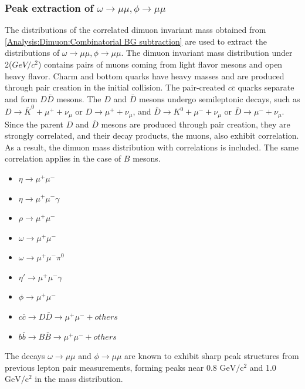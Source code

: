             \subsubsection{Peak extraction of $\omega \rightarrow \mu\mu ,\phi \rightarrow \mu\mu$}
            \label{Peak_extraction}
                The distributions of the correlated dimuon invariant mass obtained from \ref{Analysis:Dimuon:Combinatorial BG subtraction} are used to extract the distributions of $\omega \rightarrow \mu\mu,\phi \rightarrow \mu\mu$. The dimuon invariant mass distribution under 2($GeV/c^2$) contains pairs of muons coming from light flavor mesons and open heavy flavor. Charm and bottom quarks have heavy masses and are produced through pair creation in the initial collision. The pair-created \(c\bar{c}\) quarks separate and form \(D\bar{D}\) mesons. The \(D\) and \(\bar{D}\) mesons undergo semileptonic decays, such as \(D \rightarrow \bar{K}^0 + \mu^+ + \nu_\mu\) or \(D \rightarrow \mu^+ + \nu_\mu\), and \(\bar{D} \rightarrow K^0 + \mu^- + \nu_\mu\) or \(\bar{D} \rightarrow \mu^- + \nu_\mu\). Since the parent \(D\) and \(\bar{D}\) mesons are produced through pair creation, they are strongly correlated, and their decay products, the muons, also exhibit correlation. As a result, the dimuon mass distribution with correlations is included. The same correlation applies in the case of \(B\) mesons.
                \begin{itemize}
                    \item $\eta \rightarrow \mu^+ \mu^-$
                    \item $\eta \rightarrow \mu^+ \mu^- \gamma$
                    \item $\rho \rightarrow \mu^+ \mu^-$
                    \item $\omega \rightarrow \mu^+ \mu^-$
                    \item $\omega \rightarrow \mu^+ \mu^- \pi^0$
                    \item $\eta' \rightarrow \mu^+ \mu^- \gamma$
                    \item $\phi \rightarrow \mu^+ \mu^-$
                    \item $c\bar{c} \rightarrow D\bar{D} \rightarrow \mu^+ \mu^- + others$
                    \item $b\bar{b} \rightarrow B\bar{B} \rightarrow \mu^+ \mu^- + others$
                \end{itemize}
                The decays \(\omega \rightarrow \mu\mu\) and \(\phi \rightarrow \mu\mu\) are known to exhibit sharp peak structures from previous lepton pair measurements, forming peaks near 0.8 \(\mathrm{GeV/c^2}\) and 1.0 \(\mathrm{GeV/c^2}\) in the mass distribution.
